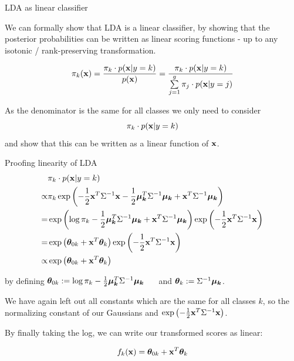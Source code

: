 \documentclass[11pt,compress,t,notes=noshow, xcolor=table]{beamer}
\begin{document}
\begin{vbframe}{LDA as linear classifier}

We can formally show that LDA is a linear classifier, by showing that the posterior probabilities
can be written as linear scoring functions - up to any isotonic / rank-preserving transformation.

$$
  \pikx = \frac{\pik \cdot \pdfxyk }{\pdfx} = \frac{\pik \cdot \pdfxyk}{\sumjg \pi_j \cdot \pdfxyk[j]}
$$

As the denominator is the same for all classes we only need to consider 
$$\pik \cdot \pdfxyk$$ 
and show that this can be written as a linear function of $\xv$.
  
\end{vbframe}

\begin{vbframe}{Proofing linearity of LDA}
\begin{eqnarray*}
& \pik \cdot \pdfxyk \\
  \propto& \pik \exp\left(- \frac{1}{2} \xv^T\Sigma^{-1}\xv - \frac{1}{2} \muk^T \Sigma^{-1} \muk + \xv^T \Sigma^{-1} \muk \right) \\
=& \exp\left(\log \pik  - \frac{1}{2} \muk^T \Sigma^{-1} \muk + \xv^T \Sigma^{-1} \muk \right) \exp\left(- \frac{1}{2} \xv^T\Sigma^{-1}\xv\right) \\
=& \exp\left(\thetav_{0k} + \xv^T \thetav_k\right) \exp\left(- \frac{1}{2} \xv^T\Sigma^{-1}\xv\right)\\
\propto& \exp\left(\thetav_{0k} + \xv^T \thetav_k\right) 
\end{eqnarray*}

by defining
$\thetav_{0k} := \log \pik  - \frac{1}{2} \muk^T \Sigma^{-1} \muk$ $\quad$ and $\thetav_k := \Sigma^{-1} \muk$.

\lz

We have again left out all constants which are the same for all classes $k$, 
  so the normalizing constant of our Gaussians and 
  $\exp\left(- \frac{1}{2} \xv^T\Sigma^{-1}\xv\right)$.

\lz

By finally taking the log, we can write our transformed scores as linear:  

$$ \fkx =  \thetav_{0k} + \xv^T \thetav_k $$

\end{vbframe}
\end{document}
